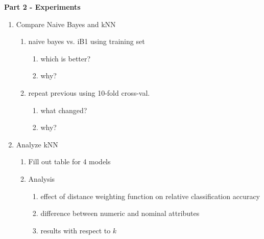{\bf Part 2 - Experiments}
\begin{enumerate}
	\item
	Compare Naive Bayes and kNN
	\begin{enumerate}
		\item
		naive bayes vs. iB1 using training set
		\begin{enumerate}
			\item
			which is better?
			
			\item
			why?

		\end{enumerate}
		
		\item
		repeat previous using 10-fold cross-val.
		\begin{enumerate}
			\item
			what changed?
			
			\item
			why?
			
		\end{enumerate}
	\end{enumerate}
	
	\item
	Analyze kNN
	\begin{enumerate}
		\item
		Fill out table for 4 models
		
		\item
		Analysis
		\begin{enumerate}
			\item
			effect of distance weighting function on relative classification accuracy
			
			\item
			difference between numeric and nominal attributes
			
			\item
			results with respect to $k$
		\end{enumerate}
		
	\end{enumerate}
	
\end{enumerate}
